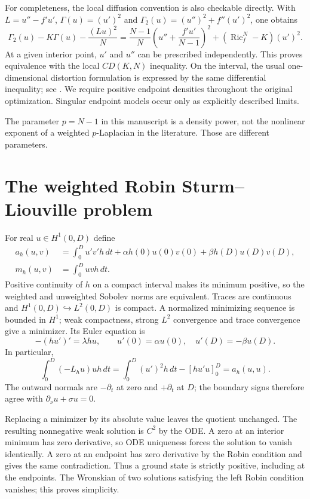 \documentclass[12pt]{amsart}
\theoremstyle{definition}
\theoremstyle{remark}
\numberwithin{equation}{section}
\DeclareMathOperator{\Ric}{Ric}
\begin{document}
For completeness, the local diffusion convention is also checkable directly. With
$L=u''-f'u'$, $\Gamma(u)=(u')^2$ and
$\Gamma_2(u)=(u'')^2+f''(u')^2$, one obtains
\[
 \Gamma_2(u)-K\Gamma(u)-\frac{(Lu)^2}{N}
 =\frac{N-1}{N}\left(u''+\frac{f'u'}{N-1}\right)^2
 +(\Ric_f^N-K)(u')^2.
\]
At a given interior point, $u'$ and $u''$ can be prescribed independently. This proves equivalence with the local $CD(K,N)$ inequality. On the interval, the usual one-dimensional distortion formulation is expressed by the same differential inequality; see \cite[\S4.1, equation (4-4)]{CM}. We require positive endpoint densities throughout the original optimization. Singular endpoint models occur only as explicitly described limits.

The parameter $p=N-1$ in this manuscript is a density power, not the nonlinear exponent of a weighted $p$-Laplacian in the literature. Those are different parameters.

\section{The weighted Robin Sturm--Liouville problem}
For real $u\in H^1(0,D)$ define
\begin{align*}
 a_h(u,v)&=\int_0^D u'v'h\,dt+\alpha h(0)u(0)v(0)+\beta h(D)u(D)v(D),\\
 m_h(u,v)&=\int_0^D uvh\,dt.
\end{align*}
Positive continuity of $h$ on a compact interval makes its minimum positive, so the weighted and unweighted Sobolev norms are equivalent. Traces are continuous and $H^1(0,D)\hookrightarrow L^2(0,D)$ is compact. A normalized minimizing sequence is bounded in $H^1$; weak compactness, strong $L^2$ convergence and trace convergence give a minimizer. Its Euler equation is
\[
 -(hu')'=\lambda hu,\qquad u'(0)=\alpha u(0),\quad u'(D)=-\beta u(D).
\]
In particular,
\[
 \int_0^D(-L_hu)u h\,dt
 =\int_0^D(u')^2h\,dt-[hu'u]_0^D=a_h(u,u).
\]
The outward normals are $-\partial_t$ at zero and $+\partial_t$ at $D$; the boundary signs therefore agree with $\partial_\nu u+\sigma u=0$.

Replacing a minimizer by its absolute value leaves the quotient unchanged. The resulting nonnegative weak solution is $C^2$ by the ODE. A zero at an interior minimum has zero derivative, so ODE uniqueness forces the solution to vanish identically. A zero at an endpoint has zero derivative by the Robin condition and gives the same contradiction. Thus a ground state is strictly positive, including at the endpoints. The Wronskian of two solutions satisfying the left Robin condition vanishes; this proves simplicity.
\end{document}
